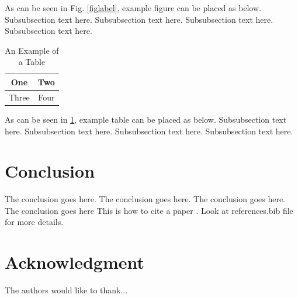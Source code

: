\documentclass[conference,onecolumn]{IEEEtran} %
\begin{document}
As can be seen in Fig. \ref{figlabel}, example figure can be placed as below.
Subsubsection text here. Subsubsection text here. Subsubsection text here. Subsubsection text here.

\begin{table}[!h]
\renewcommand{\arraystretch}{1.3}
  \caption{An Example of a Table}
  \label{tablelabel}
  \centering
  \begin{tabular}{|c||c|}
  \hline
  One & Two\\
  \hline
  Three & Four\\
  \hline
  \end{tabular}
\end{table}

As can be seen in \ref{tablelabel}, example table can be placed as below. Subsubsection text here. Subsubsection text here. Subsubsection text here. Subsubsection text here.

\section{Conclusion}
The conclusion goes here. The conclusion goes here. The conclusion goes here. The conclusion goes here This is how to cite a paper \cite{jung2018multi}. Look at references.bib file for more details.

\section*{Acknowledgment}
The authors would like to thank...






\end{document}
